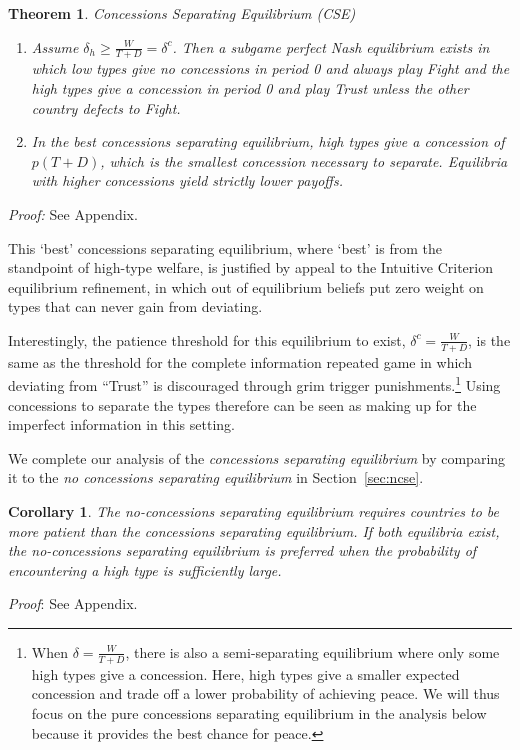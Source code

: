 \documentclass[12pt, letterpaper]{article}
\newcommand{\de}{\delta}
\newtheorem{theorem}{Theorem}
\newtheorem{corollary}{Corollary}
\begin{document}
\begin{theorem}
\emph{Concessions Separating Equilibrium (CSE)}
	\begin{enumerate}
		\item[(a)] Assume $\delta_h \geq \frac{W}{T+D} = \de^{c}$. Then a subgame perfect Nash equilibrium exists in which low types give no concessions in period 0 and always play Fight and the high types give a concession in period 0 and play Trust unless the other country defects to Fight.
		\item[(b)] In the best concessions separating equilibrium, high types give a concession of $p(T + D)$, which is the smallest concession necessary to separate. Equilibria with higher concessions yield strictly lower payoffs.
\end{enumerate}
	\label{theorem:2}
\end{theorem}
\emph{Proof:} See Appendix.

This `best' concessions separating equilibrium, where `best' is from the standpoint of high-type welfare, is justified by appeal to the Intuitive Criterion equilibrium refinement, in which out of equilibrium beliefs put zero weight on types that can never gain from deviating.

Interestingly, the patience threshold for this equilibrium to exist, $\de^c = \frac{W}{T+D}$, is the same as the threshold for the complete information repeated game in which deviating from ``Trust'' is discouraged through grim trigger punishments.\footnote{When $\de = \frac{W}{T+D}$, there is also a semi-separating equilibrium where only some high types give a concession. Here, high types give a smaller expected concession and trade off a lower probability of achieving peace. We will thus focus on the pure concessions separating equilibrium in the analysis below because it provides the best chance for peace.} Using concessions to separate the types therefore can be seen as making up for the imperfect information in this setting.

We complete our analysis of the \emph{concessions separating equilibrium} by comparing it to the \emph{no concessions separating equilibrium} in Section~\ref{sec:ncse}.

\begin{corollary}
	The \emph{no-concessions separating equilibrium} requires countries to be more patient than the \emph{concessions separating equilibrium}. If both equilibria exist, the \emph{no-concessions separating equilibrium} is preferred when the probability of encountering a high type is sufficiently large.
	\label{corollary:1}
\end{corollary}
\emph{Proof}: See Appendix.
\end{document}

